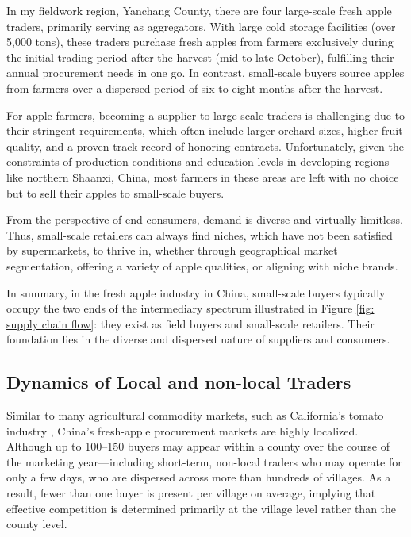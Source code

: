 In my fieldwork region, Yanchang County, there are four large-scale fresh apple traders, primarily serving as aggregators. With large cold storage facilities (over 5,000 tons), these traders purchase fresh apples from farmers exclusively during the initial trading period after the harvest (mid-to-late October), fulfilling their annual procurement needs in one go. In contrast, small-scale buyers source apples from farmers over a dispersed period of six to eight months after the harvest.

For apple farmers, becoming a supplier to large-scale traders is challenging due to their stringent requirements, which often include larger orchard sizes, higher fruit quality, and a proven track record of honoring contracts. Unfortunately, given the constraints of production conditions and education levels in developing regions like northern Shaanxi, China, most farmers in these areas are left with no choice but to sell their apples to small-scale buyers.

From the perspective of end consumers, demand is diverse and virtually limitless. Thus, small-scale retailers can always find niches, which have not been satisfied by supermarkets, to thrive in, whether through geographical market segmentation, offering a variety of apple qualities, or aligning with niche brands.

In summary, in the fresh apple industry in China, small-scale buyers typically occupy the two ends of the intermediary spectrum illustrated in Figure \ref{fig: supply chain flow}: they exist as field buyers and small-scale retailers. Their foundation lies in the diverse and dispersed nature of suppliers and consumers.




\subsection{Dynamics of Local and non-local Traders \label{Section: intro of Local and non-local traders}}
\noindent Similar to many agricultural commodity markets, such as California's tomato industry \citep{hamilton2024spatial}, China's fresh-apple procurement markets are highly localized. Although up to 100--150 buyers may appear within a county over the course of the marketing year—including short-term, non-local traders who may operate for only a few days, who are dispersed across more than hundreds of villages. As a result, fewer than one buyer is present per village on average, implying that effective competition is determined primarily at the village level rather than the county level.

